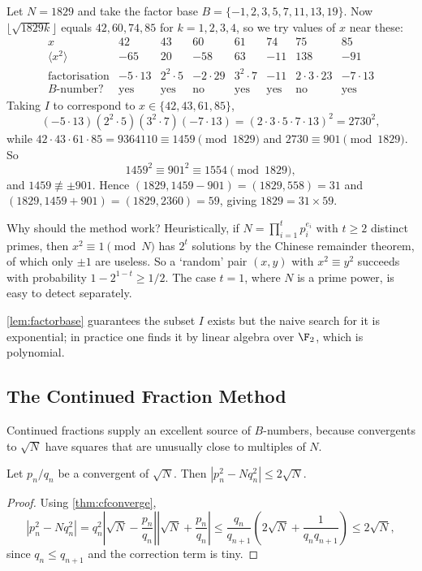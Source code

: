 \begin{example}
	Let $N = 1829$ and take the factor base $B = \{-1, 2, 3, 5, 7, 11, 13, 19\}$. Now $\lfloor\sqrt{1829k}\rfloor$ equals $42, 60, 74, 85$ for $k = 1,2,3,4$, so we try values of $x$ near these:
	$$
	\begin{array}{c|ccccccc}
		x & 42 & 43 & 60 & 61 & 74 & 75 & 85 \\ \hline
		\langle x^2\rangle & -65 & 20 & -58 & 63 & -11 & 138 & -91 \\
		\text{factorisation} & -5\cdot13 & 2^2\cdot 5 & -2\cdot29 & 3^2\cdot7 & -11 & 2\cdot3\cdot23 & -7\cdot13 \\
		B\text{-number?} & \text{yes} & \text{yes} & \text{no} & \text{yes} & \text{yes} & \text{no} & \text{yes}
	\end{array}
	$$
	Taking $I$ to correspond to $x \in \{42, 43, 61, 85\}$,
	$$
	(-5\cdot13)(2^2\cdot5)(3^2\cdot7)(-7\cdot13) = (2\cdot3\cdot5\cdot7\cdot13)^2 = 2730^2,
	$$
	while $42\cdot43\cdot61\cdot85 = 9364110 \equiv 1459 \pmod{1829}$ and $2730 \equiv 901\pmod{1829}$. So
	$$
	1459^2 \equiv 901^2 \equiv 1554 \pmod{1829},
	$$
	and $1459 \not\equiv\pm901$. Hence $(1829, 1459 - 901) = (1829, 558) = 31$ and $(1829, 1459+901) = (1829, 2360) = 59$, giving $1829 = 31\times59$.
\end{example}

\begin{remark}
	Why should the method work? Heuristically, if $N = \prod_{i=1}^tp_i^{e_i}$ with $t \geq 2$ distinct primes, then $x^2 \equiv 1\pmod N$ has $2^t$ solutions by the Chinese remainder theorem, of which only $\pm1$ are useless. So a `random' pair $(x,y)$ with $x^2\equiv y^2$ succeeds with probability $1 - 2^{1-t} \geq 1/2$. The case $t = 1$, where $N$ is a prime power, is easy to detect separately.

	\autoref{lem:factorbase} guarantees the subset $I$ exists but the naive search for it is exponential; in practice one finds it by linear algebra over $\F_2$, which is polynomial.
\end{remark}

\subsection{The Continued Fraction Method}

Continued fractions supply an excellent source of $B$-numbers, because convergents to $\sqrt N$ have squares that are unusually close to multiples of $N$.

\begin{lemma}
	Let $p_n/q_n$ be a convergent of $\sqrt N$. Then $|p_n^2 - Nq_n^2| \leq 2\sqrt N$.
\end{lemma}
\begin{proof}
	Using \autoref{thm:cfconverge},
	$$
	|p_n^2 - Nq_n^2| = q_n^2\left|\sqrt N - \frac{p_n}{q_n}\right|\left|\sqrt N + \frac{p_n}{q_n}\right| \leq \frac{q_n}{q_{n+1}}\left(2\sqrt N + \frac1{q_nq_{n+1}}\right) \leq 2\sqrt N,
	$$
	since $q_n \leq q_{n+1}$ and the correction term is tiny.
\end{proof}


